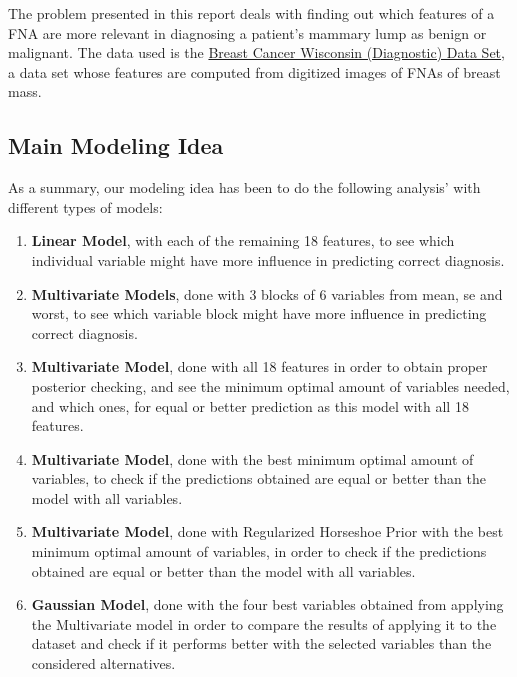 \documentclass[
]{article}
\providecommand{\tightlist}{%
  \setlength{\itemsep}{0pt}\setlength{\parskip}{0pt}}
\begin{document}
The problem presented in this report deals with finding out which
features of a FNA are more relevant in diagnosing a patient's mammary
lump as benign or malignant. The data used is the
\href{https://archive.ics.uci.edu/ml/datasets/Breast+Cancer+Wisconsin+\%28Diagnostic\%29}{Breast
Cancer Wisconsin (Diagnostic) Data Set}, a data set whose features are
computed from digitized images of FNAs of breast mass.

\hypertarget{main-modeling-idea}{%
\subsection{Main Modeling Idea}\label{main-modeling-idea}}

As a summary, our modeling idea has been to do the following analysis'
with different types of models:

\begin{enumerate}
\def\labelenumi{\arabic{enumi}.}
\tightlist
\item
  \textbf{Linear Model}, with each of the remaining 18 features, to see
  which individual variable might have more influence in predicting
  correct diagnosis.
\item
  \textbf{Multivariate Models}, done with 3 blocks of 6 variables from
  mean, se and worst, to see which variable block might have more
  influence in predicting correct diagnosis.
\item
  \textbf{Multivariate Model}, done with all 18 features in order to
  obtain proper posterior checking, and see the minimum optimal amount
  of variables needed, and which ones, for equal or better prediction as
  this model with all 18 features.
\item
  \textbf{Multivariate Model}, done with the best minimum optimal amount
  of variables, to check if the predictions obtained are equal or better
  than the model with all variables.
\item
  \textbf{Multivariate Model}, done with Regularized Horseshoe Prior
  with the best minimum optimal amount of variables, in order to check
  if the predictions obtained are equal or better than the model with
  all variables.
\item
  \textbf{Gaussian Model}, done with the four best variables obtained
  from applying the Multivariate model in order to compare the results
  of applying it to the dataset and check if it performs better with the
  selected variables than the considered alternatives.
\end{enumerate}
\end{document}
